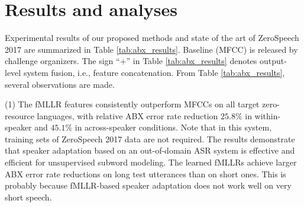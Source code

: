 \documentclass[a4paper]{article}
\newcommand{\quotes}[1]{``#1''}
\begin{document}


\section{Results and analyses}
Experimental results of our proposed methods and state of the art of ZeroSpeech 2017 are summarized in Table \ref{tab:abx_results}. Baseline (MFCC) is released by challenge organizers. The sign \quotes{+} in Table \ref{tab:abx_results} denotes output-level system fusion, i.e., feature concatenation. From Table \ref{tab:abx_results}, several observations are made.

(1) The fMLLR features consistently outperform MFCCs on all target zero-resource languages, with relative ABX error rate reduction $25.8\%$ in within-speaker and $45.1\%$ in across-speaker conditions.
Note that in this system, training sets of ZeroSpeech 2017 data are not required.
The results demonstrate that speaker adaptation based on an out-of-domain ASR system is effective and efficient for unsupervised subword modeling. The learned fMLLRs
achieve  larger ABX error rate reductions on long test utterances than on short ones. This is probably because fMLLR-based speaker adaptation does not work well on very short speech. 
\end{document}
